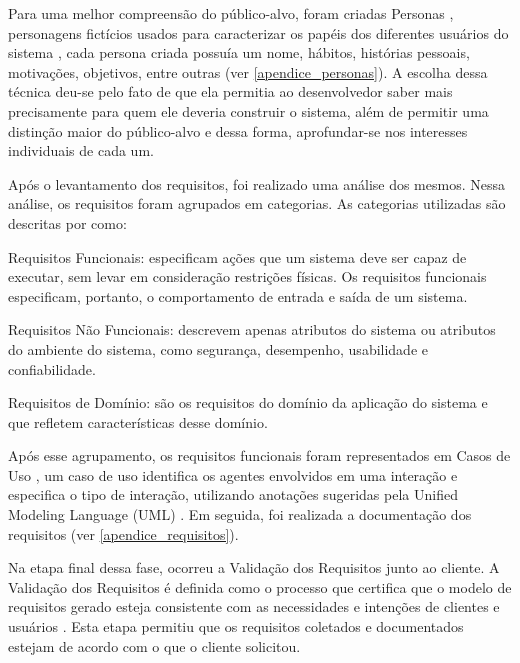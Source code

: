 Para uma melhor compreensão do público-alvo, foram criadas Personas 
\cite{pruitt2003personas}, personagens fictícios usados para caracterizar os papéis dos diferentes usuários do sistema \cite{guerra2010colaboraccao}, cada persona criada possuía um nome, hábitos, histórias pessoais, motivações, objetivos, entre outras (ver \autoref{apendice_personas}). A escolha dessa técnica deu-se pelo fato de que ela permitia ao desenvolvedor saber mais precisamente para quem ele deveria construir o sistema, além de permitir uma distinção maior do público-alvo e dessa forma, aprofundar-se nos interesses individuais de cada um.

Após o levantamento dos requisitos, foi realizado uma análise dos mesmos. Nessa análise, os requisitos foram agrupados em categorias. As categorias utilizadas são descritas por  como:
\begin{alineascomponto}
    \item Requisitos Funcionais: especificam ações que um sistema deve ser
capaz de executar, sem levar em consideração restrições físicas. Os requisitos
funcionais especificam, portanto, o comportamento de entrada e saída de um
sistema.
    \item Requisitos Não Funcionais: descrevem apenas atributos do sistema ou
atributos do ambiente do sistema, como segurança, desempenho, usabilidade e
confiabilidade.
    \item Requisitos de Domínio: são os requisitos do domínio da aplicação do sistema e que refletem características desse domínio.
\end{alineascomponto}

Após esse agrupamento, os requisitos funcionais foram representados em Casos de Uso \cite{jacobson92engenharia}, um caso de uso identifica os agentes envolvidos em uma interação e especifica o tipo de interação, utilizando anotações sugeridas pela Unified Modeling Language (UML) 
. Em seguida, foi realizada a documentação dos requisitos (ver \autoref{apendice_requisitos}).

Na etapa final dessa fase, ocorreu a Validação dos Requisitos junto ao cliente.  A Validação dos Requisitos é definida como o processo que certifica que o modelo de requisitos gerado  esteja  consistente  com  as  necessidades  e  intenções  de  clientes  e usuários \cite{rilston2003metodologia}. Esta etapa permitiu que os requisitos coletados e documentados estejam de acordo com o que o cliente solicitou.

